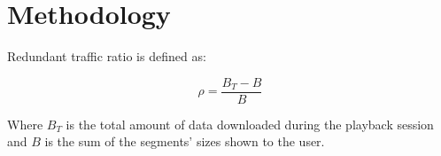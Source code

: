 
\section{Methodology}

\label{sec:sysmodel}

Redundant traffic ratio is defined as:

\begin{equation}
	\rho = \frac{B_T-B}{B}
\end{equation}

Where $B_T$ is the total amount of data downloaded during the playback session and $B$ is the sum of the segments' sizes shown to the user.





